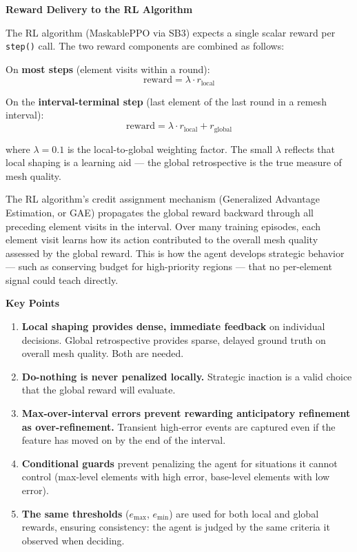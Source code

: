 \documentclass[11pt]{article}
\begin{document}
\vspace{0.5cm}
\noindent\textbf{\textcolor{solvercolor}{Reward Delivery to the RL Algorithm}}

\vspace{0.15cm}
\noindent The RL algorithm (MaskablePPO via SB3) expects a single scalar reward per \texttt{step()} call. The two reward components are combined as follows:

\vspace{0.2cm}
\noindent On \textbf{most steps} (element visits within a round):
\[
\text{reward} = \lambda \cdot r_{\text{local}}
\]

\noindent On the \textbf{interval-terminal step} (last element of the last round in a remesh interval):
\[
\text{reward} = \lambda \cdot r_{\text{local}} + r_{\text{global}}
\]

\noindent where $\lambda = 0.1$ is the local-to-global weighting factor. The small $\lambda$ reflects that local shaping is a learning aid --- the global retrospective is the true measure of mesh quality.

\vspace{0.15cm}
\noindent The RL algorithm's credit assignment mechanism (Generalized Advantage Estimation, or GAE) propagates the global reward backward through all preceding element visits in the interval. Over many training episodes, each element visit learns how its action contributed to the overall mesh quality assessed by the global reward. This is how the agent develops strategic behavior --- such as conserving budget for high-priority regions --- that no per-element signal could teach directly.

\vspace{0.5cm}
\noindent\textbf{Key Points}

\begin{enumerate}[leftmargin=1.5em, itemsep=4pt]
    \item \textbf{Local shaping provides dense, immediate feedback} on individual decisions. Global retrospective provides sparse, delayed ground truth on overall mesh quality. Both are needed.
    \item \textbf{Do-nothing is never penalized locally.} Strategic inaction is a valid choice that the global reward will evaluate.
    \item \textbf{Max-over-interval errors prevent rewarding anticipatory refinement as over-refinement.} Transient high-error events are captured even if the feature has moved on by the end of the interval.
    \item \textbf{Conditional guards} prevent penalizing the agent for situations it cannot control (max-level elements with high error, base-level elements with low error).
    \item \textbf{The same thresholds} ($e_{\max}$, $e_{\min}$) are used for both local and global rewards, ensuring consistency: the agent is judged by the same criteria it observed when deciding.
\end{enumerate}
\end{document}
